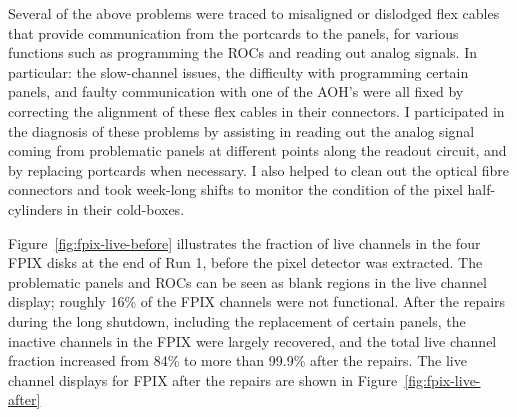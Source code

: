 Several of the above problems were traced to misaligned or dislodged flex cables that provide communication from the portcards to the panels, for various functions such as programming the ROCs and reading out analog signals. In particular: the slow-channel issues, the difficulty with programming certain panels, and faulty communication with one of the AOH's were all fixed by correcting the alignment of these flex cables in their connectors. I participated in the diagnosis of these problems by assisting in reading out the analog signal coming from problematic panels at different points along the readout circuit, and by replacing portcards when necessary. I also helped to clean out the optical fibre connectors and took week-long shifts to monitor the condition of the pixel half-cylinders in their cold-boxes.

Figure~\ref{fig:fpix-live-before} illustrates the fraction of live channels in the four FPIX disks at the end of Run 1, before the pixel detector was extracted. The problematic panels and ROCs can be seen as blank regions in the live channel display; roughly 16\% of the FPIX channels were not functional. After the repairs during the long shutdown, including the replacement of certain panels, the inactive channels in the FPIX were largely recovered, and the total live channel fraction increased from 84\% to more than 99.9\% after the repairs. The live channel displays for FPIX after the repairs are shown in Figure~\ref{fig:fpix-live-after}

